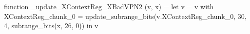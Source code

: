 function _update_XContextReg_XBadVPN2 (v, x) = let v = { v with XContextReg_chunk_0 = update_subrange_bits(v.XContextReg_chunk_0, 30, 4, subrange_bits(x, 26, 0)) } in
  v
